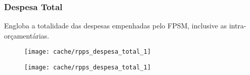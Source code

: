 
\subsubsection{Despesa Total}

Engloba a totalidade das despesas empenhadas pelo FPSM, inclusive as intra-orçamentárias.





\begin{figure}[H]
\center
\texttt{[image: cache/rpps\_despesa\_total\_1]}
\end{figure}

\begin{figure}[H]
\center
\texttt{[image: cache/rpps\_despesa\_total\_1]}
\end{figure}

